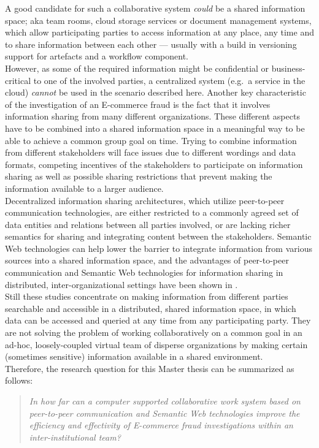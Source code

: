 A good candidate for such a collaborative system \emph{could} be a shared information space; aka team rooms, cloud storage services or document management systems, which allow participating parties to access information at any place, any time and to share information between each other --- usually with a build in versioning support for artefacts and a workflow component. \\

However, as some of the required information might be confidential or business-critical to one of the involved parties, a centralized system (e.g.\ a service in the cloud) \emph{cannot} be used in the scenario described here. Another key characteristic of the investigation of an \gls{E-commerce} fraud is the fact that it involves information sharing from many different organizations. These different aspects have to be combined into a shared information space in a meaningful way to be able to achieve a common group goal on time. Trying to combine information from different stakeholders will face issues due to different wordings and data formats, competing incentives of the stakeholders to participate on information sharing as well as possible sharing restrictions that prevent making the information available to a larger audience. \\

Decentralized information sharing architectures, which utilize peer-to-peer communication technologies, are either restricted to a commonly agreed set of data entities and relations between all parties involved, or are lacking richer semantics for sharing and integrating content between the stakeholders. Semantic Web technologies can help lower the barrier to integrate information from various sources into a shared information space, and the advantages of peer-to-peer communication and Semantic Web technologies for information sharing in distributed, inter-organizational settings have been shown in \citep{Staab2006}. \\

Still these studies concentrate on making information from different parties searchable and accessible in a distributed, shared information space, in which data can be accessed and queried at any time from any participating party. They are not solving the problem of working collaboratively on a common goal in an ad-hoc, loosely-coupled virtual team of disperse organizations by making certain (sometimes sensitive) information available in a shared environment. \\

Therefore, the research question for this Master thesis can be summarized as follows: \@

\begin{quotation}
  \textit{In how far can a computer supported collaborative work system based on peer-to-peer communication and Semantic Web technologies improve the efficiency and effectivity of \gls{E-commerce} fraud investigations within an inter-institutional team?}
\end{quotation}

